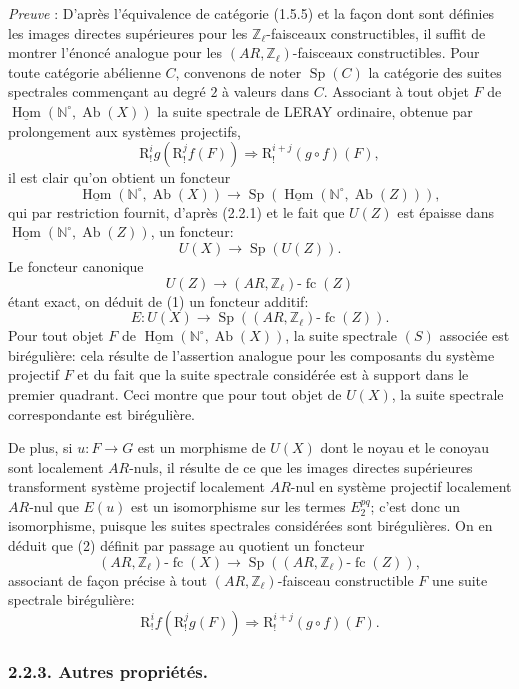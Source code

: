 \documentclass[11pt]{article}
\DeclareMathOperator{\Hom}{Hom}
\providecommand{\uHom}{\underline{\Hom}}
\providecommand{\Hom}{\operatorname{Hom}}
\providecommand{\Sp}{\operatorname{Sp}}
\providecommand{\Ab}{\operatorname{Ab}}
\providecommand{\fc}{\operatorname{fc}}
\providecommand{\Ab}{\operatorname{Ab}}
\providecommand{\Hom}{\operatorname{Hom}}
\begin{document}
\emph{Preuve} : D'après l'équivalence de catégorie (1.5.5) et la façon dont sont définies les images directes supérieures pour les \(\mathbb Z_\ell\)-faisceaux constructibles, il suffit de montrer l'énoncé analogue pour les \((AR,\mathbb Z_\ell)\)-faisceaux constructibles. Pour toute catégorie abélienne \(C\), convenons de noter \(\Sp(C)\) 
la
catégorie des suites spectrales commençant au degré \(2\) à valeurs dans \(C\). Associant à tout objet \(F\) de \(\uHom(\mathbb N^\circ,\Ab(X))\) la suite spectrale de LERAY ordinaire, obtenue par prolongement aux systèmes projectifs,
\[
\mathrm{R}^i_! g(\mathrm{R}^j_! f(F))\Longrightarrow \mathrm{R}^{i+j}_!(g\circ f)(F),
\tag{S}
\]
il est clair qu'on obtient un foncteur
\[
\uHom(\mathbb N^\circ,\Ab(X))\longrightarrow \Sp(\uHom(\mathbb N^\circ,\Ab(Z))),
\]
qui par restriction fournit, d'après (2.2.1) et le fait que \(U(Z)\) est épaisse dans \(\uHom(\mathbb N^\circ,\Ab(Z))\), un foncteur:
\[
U(X)\longrightarrow \Sp(U(Z)).
\tag{1}
\]
Le foncteur canonique
\[
U(Z)\longrightarrow (AR,\mathbb Z_\ell)\text{-}\fc(Z)
\]
étant exact, on déduit de (1) un foncteur additif:
\[
E:U(X)\longrightarrow \Sp((AR,\mathbb Z_\ell)\text{-}\fc(Z)).
\tag{2}
\]
Pour tout objet \(F\) de \(\uHom(\mathbb N^\circ,\Ab(X))\), la suite spectrale \((S)\) associée est birégulière: cela résulte de l'assertion analogue pour les composants du système projectif \(F\) et du fait que la suite spectrale considérée est à support dans le premier quadrant. Ceci montre que pour tout objet de \(U(X)\), la suite spectrale correspondante est birégulière.

De plus, si \(u:F\to G\) est un morphisme de \(U(X)\) dont le noyau et le conoyau sont localement \(AR\)-nuls, il résulte de ce que les images directes supérieures transforment système projectif localement \(AR\)-nul en système projectif localement \(AR\)-nul que \(E(u)\) est un isomorphisme sur les termes \(E_2^{pq}\); c'est donc un isomorphisme, puisque les suites spectrales considérées sont birégulières. On en déduit que (2) définit par passage au quotient un foncteur
\[
(AR,\mathbb Z_\ell)\text{-}\fc(X)
\longrightarrow \Sp((AR,\mathbb Z_\ell)\text{-}\fc(Z)),
\tag{3}
\]
associant de façon précise à tout \((AR,\mathbb Z_\ell)\)-faisceau constructible \(F\) une suite spectrale birégulière:
\[
\mathrm{R}^i_!f(\mathrm{R}^j_!g(F))\Longrightarrow \mathrm{R}^{i+j}_!(g\circ f)(F).
\]

\subsubsection*{2.2.3. Autres propriétés.}
\end{document}
